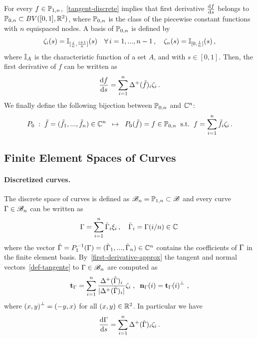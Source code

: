 For every $f\in \mathbb{P}_{1,n}$,~\eqref{tangent-discrete} implies that  first derivative $\frac{\mathrm{d} f}{\mathrm{d} s}$ belongs to $\mathbb{P}_{0,n} \subset  BV([0,1], \mathbb{R}^2)$, where $\mathbb{P}_{0,n}$ is the class of the piecewise constant functions with $n$ equispaced  nodes. A basis of $\mathbb{P}_{0,n}$ is defined by 
\begin{align*}
\zeta_i(s) =\mathbb{I}{}_{[\frac{i}{n},\frac{i+1}{n}]}(s) \quad  \forall \, i= 1, ..., n-1 \,,\quad 
\zeta_n(s) =\mathbb{I}{}_{[0,\frac{1}{n}]}(s) \,,
\end{align*}
where $\mathbb{I}_A$ is the characteristic function of a set $A$, and with $s\in [0,1]$. Then, the first derivative of $f$ can be written as 
\begin{equation}\label{first-derivative-approx}
\frac{\mathrm{d} f}{\mathrm{d} s} = \sum_{i=1}^n \Delta^+(\tilde{f})_i\zeta_i\,.
\end{equation}
We finally define the following bijection between $\mathbb{P}_{0,n}$ and $\mathbb{C}^n$:
\begin{equation}\label{bijection2}
P_0\; : \; \tilde{f}=(\tilde{f}_1,..., \tilde{f}_n)\in \mathbb{C}^n\;\;\mapsto\;\; P_0(\tilde{f})= f\in \mathbb{P}_{0,n}   \mbox{\;\;s.t.\;\;} f=\sum_{i=1}^n\tilde{ f}_i\zeta_i\,.
\end{equation}

\subsection{Finite Element Spaces of Curves} 

\paragraph{Discretized curves.} 

The discrete space of curves is defined as $\mathcal{B}_n= \mathbb{P}_{1,n} \subset \mathcal{B}$ and every curve $\Gamma\in\mathcal{B}_n$ can be written as
\begin{equation}\label{gamma-coord}
	\Gamma=\sum_{i=1}^n \tilde{\Gamma}_i\xi_i\,,\quad \tilde{\Gamma}_i=\Gamma(i/n)\in \mathbb{C}\,
\end{equation}
where the vector $\tilde{\Gamma}=P_1^{-1}(\Gamma) = (\tilde{\Gamma}_1, ..., \tilde{\Gamma}_n)\in \mathbb{C}^n$ contains the coefficients of $\Gamma$ in the finite element basis. By~\eqref{first-derivative-approx} the tangent and normal vectors~\eqref{def-tangente} to $\Gamma\in \mathcal{B}_n$ are computed as 
\begin{equation}\label{tan-norm}
\mathbf{t}_\Gamma= \sum_{i=1}^n\frac{\Delta^+ (\tilde{\Gamma})_i}{|\Delta^+ (\tilde{\Gamma})_i|}\zeta_i  \;,\;\; \mathbf{n}_\Gamma(i)= {\mathbf{t}_\Gamma(i)}^\bot~,
\end{equation}
where ${(x,y)}^\bot=(-y,x)$ for all $(x,y) \in \mathbb{R}^2$.
In particular we have 
\begin{equation}\label{arc-length}
	\frac{\mathrm{d}\Gamma}{\mathrm{d} s} = \sum_{i=1}^n \Delta^+(\tilde{\Gamma})_i\zeta_i\,.
\end{equation}


